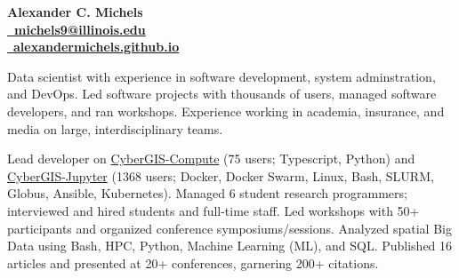 \documentclass{acmresume}
\begin{document}
	
	\begin{multicols}{2}
		\textbf{\huge Alexander C. Michels}\\ \columnbreak
        \hfill\href{mailto:michels9@illinois.edu}{\textbf{\faEnvelope~michels9@illinois.edu}} \\
        \hfill\href{http://alexandermichels.github.io}{\faGlobeAmericas~\textbf{alexandermichels.github.io}} \\
	\end{multicols}
    \vspace*{-.25cm}


Data scientist with experience in software development, system adminstration, and DevOps. Led software projects with thousands of users, managed software developers, and ran workshops. Experience working in academia, insurance, and media on large, interdisciplinary teams.

\vspace*{.1cm}
	
	
		
		
	
	
        \begin{titemize}
            \titem Lead developer on \href{https://github.com/cybergis/cybergis-compute-python-sdk}{CyberGIS-Compute} (75 users; Typescript, Python) and \href{https://cybergisx.cigi.illinois.edu/}{CyberGIS-Jupyter} (1368 users; Docker, Docker Swarm, Linux, Bash, SLURM, Globus, Ansible, Kubernetes).
            \titem Managed 6 student research programmers; interviewed and hired students and full-time staff.
            \titem Led workshops with 50+ participants and organized conference symposiums/sessions.
            \titem Analyzed spatial Big Data using Bash, HPC, Python, Machine Learning (ML), and SQL.
            \titem Published 16 articles and presented at 20+ conferences, garnering 200+ citations.
        \end{titemize}
\end{document}
